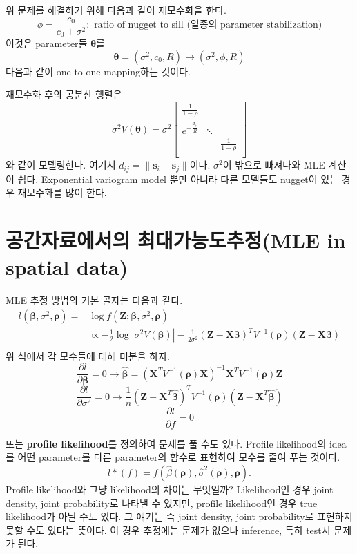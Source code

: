 \documentclass[b5paper,]{scrbook}
\theoremstyle{plain}
\theoremstyle{definition}
\numberwithin{equation}{section}
\begin{document}
위 문제를 해결하기 위해 다음과 같이 재모수화을 한다.
\[\phi=\frac{c_{0}}{c_{0}+\sigma^{2}}: \text{ ratio of nugget to sill (일종의 parameter stabilization)}\]
이것은 parameter들 \(\boldsymbol{\theta}\)를
\[\boldsymbol{\theta}=(\sigma^{2}, c_{0}, R) \rightarrow (\sigma^{2}, \phi , R)\]
다음과 같이 one-to-one mapping하는 것이다.

재모수화 후의 공분산 행렬은 \[
\sigma^{2}V(\boldsymbol{\theta}) = \sigma^{2} 
\begin{bmatrix}
\frac{1}{1-\rho} &  &  \\
e^{-\frac{d_{ij}}{R}} & \ddots &  \\
 &  & \frac{1}{1-\rho}\\
\end{bmatrix}
\] 와 같이 모델링한다. 여기서
\(d_{ij}=\|\mathbf{s}_{i}-\mathbf{s}_{j}\|\)이다. \(\sigma^{2}\)이
밖으로 빠져나와 MLE 계산이 쉽다. Exponential variogram model 뿐만 아니라
다른 모델들도 nugget이 있는 경우 재모수화를 많이 한다.

\section{공간자료에서의 최대가능도추정(MLE in spatial
data)}\label{-mle-in-spatial-data}

MLE 추정 방법의 기본 골자는 다음과 같다. \[
\begin{aligned}
l(\boldsymbol{\beta},\sigma^{2}, \boldsymbol{\rho})=&\log f(\mathbf{Z};\boldsymbol{\beta},\sigma^{2},\boldsymbol{\rho})\\
&\varpropto -\frac{1}{2}\log |\sigma^{2}V(\boldsymbol{\beta})| -\frac{1}{2\sigma^{2}}(\mathbf{Z}-\mathbf{X}\boldsymbol{\beta})^{T}V^{-1}(\boldsymbol{\rho})(\mathbf{Z}-\mathbf{X}\boldsymbol{\beta})\\
\end{aligned}
\] 위 식에서 각 모수들에 대해 미분을 하자.
\[\frac{\partial l}{\partial \boldsymbol{\beta}}=0 \rightarrow \hat{\boldsymbol{\beta}}=(\mathbf{X}^{T}V^{-1}(\boldsymbol{\rho})\mathbf{X})^{-1}\mathbf{X}^{T}V^{-1}(\boldsymbol{\rho})\mathbf{Z}\]
\[\frac{\partial l}{\partial \sigma^{2}}=0 \rightarrow \frac{1}{n}(\mathbf{Z}-\mathbf{X}^{T}\hat{\boldsymbol{\beta}})^{T}V^{-1}(\boldsymbol{\rho})(\mathbf{Z}-\mathbf{X}^{T}\hat{\boldsymbol{\beta}})\]
\[\frac{\partial l}{\partial f}=0\]

또는 \textbf{profile likelihood}를 정의하여 문제를 풀 수도 있다. Profile
likelihood의 idea를 어떤 parameter를 다른 parameter의 함수로 표현하여
모수를 줄여 푸는 것이다.
\[l*(f)=f(\hat{\beta}(\boldsymbol{\rho}), \hat{\sigma}^{2}(\boldsymbol{\rho}),\boldsymbol{\rho}).\]
Profile likelihood와 그냥 likelihood의 차이는 무엇일까? Likelihood인
경우 joint density, joint probability로 나타낼 수 있지만, profile
likelihood인 경우 true likelihood가 아닐 수도 있다. 그 얘기는 즉 joint
density, joint probability로 표현하지 못할 수도 있다는 뜻이다. 이 경우
추정에는 문제가 없으나 inference, 특히 test시 문제가 된다.
\end{document}

